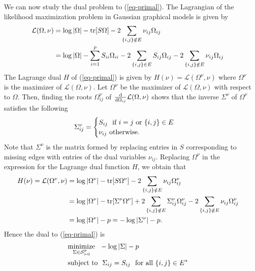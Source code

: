 We can now study the dual problem to (\ref{eq-primal}). The Lagrangian of the likelihood maximization problem in Gaussian graphical models is given by
\begin{align*}
    \mathcal{L}(\Omega, \nu)
    &= \log |\Omega| - {\textrm{tr}}[S\Omega] - 2 \sum_{{\left\{i, j\right\}} \notin E} \nu_{ij}\Omega_{ij}\\
    &= \log |\Omega| - \sum_{i=1}^p S_{ii}\Omega_{ii} - 2 \sum_{{\left\{i,j\right\}} \in E} S_{ij}\Omega_{ij} - 2 \sum_{{\left\{i, j\right\}} \notin E} \nu_{ij}\Omega_{ij}
\end{align*}
The Lagrange dual $H$ of (\ref{eq-primal}) is given by $H(\nu) = \mathcal{L}(\Omega^\nu, \nu)$ where $\Omega^\nu$ is the maximizer of $\mathcal{L}(\Omega, \nu)$. Let $\Omega^\nu$ be the maximizer of $\mathcal{L}(\Omega, \nu)$ with respect to $\Omega$. Then, finding the roots $\Omega^\nu_{ij}$ of $\frac{\text{d}}{\text{d}\Omega_{ij}} {\mathcal{L}}(\Omega, \nu)$ shows that the inverse $\Sigma^\nu$ of $\Omega^\nu$ satisfies the following
\begin{equation*}
    \Sigma^\nu_{ij} = \begin{cases}
        S_{ij}\ {\textrm{ if }} i = j {\textrm{ or }} {\left\{i, j\right\}} \in E\\
        \nu_{ij}\ {\textrm{otherwise}}.
    \end{cases}
\end{equation*}
Note that $\Sigma^\nu$ is the matrix formed by replacing entries in $S$ corresponding to missing edges with entries of the dual variables $\nu_{ij}$. Replacing $\Omega^\nu$ in the expression for the Lagrange dual function $H$, we obtain that
\begin{align*}
    H(\nu) 
    = {\mathcal{L}}(\Omega^\nu, \nu)
    &= \log |\Omega^\nu| - {\textrm{tr}}[S\Omega^\nu] - 2 \sum_{{\left\{i, j\right\}} \notin E} \nu_{ij}\Omega^\nu_{ij}\\
    &= \log |\Omega^\nu| - {\textrm{tr}}[\Sigma^\nu\Omega^\nu] + 2 \sum_{{\left\{i, j\right\}} \notin E} \Sigma^\nu_{ij}\Omega^\nu_{ij} - 2 \sum_{{\left\{i, j\right\}} \notin E} \nu_{ij}\Omega^\nu_{ij}\\
    &= \log |\Omega^\nu| - p = -\log |\Sigma^\nu| - p.
\end{align*}
Hence the dual to (\ref{eq-primal}) is
\begin{align} \label{eq-dual}
    \begin{split}
        &\underset{\Sigma \in \S^p_{\succ 0}}{\t{minimize}}\ \  -\log |\Sigma| - p\\
        &\t{subject to}\ \ \Sigma_{ij} = S_{ij}\ \t{ for all } \eset{i, j} \in E^*
    \end{split}
\end{align}
